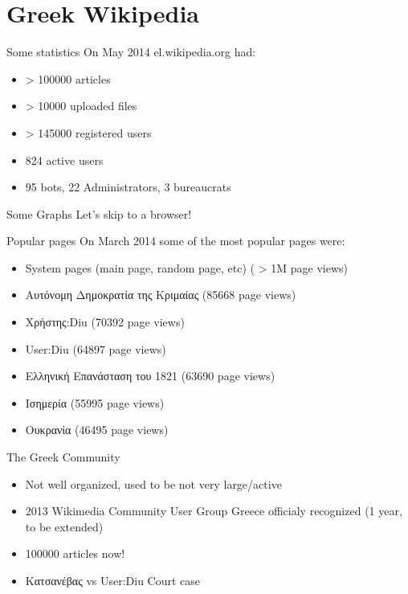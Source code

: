\documentclass{beamer}
\begin{document}
\section{Greek Wikipedia}
\begin{frame} {Some statistics}
	On May 2014 el.wikipedia.org had:
	\begin{itemize}
		\pause \item > 100000 articles
		\pause \item > 10000 uploaded files
		\pause \item > 145000 registered users
		\pause \item 824 active users
		\pause \item 95 bots, 22 Administrators, 3 bureaucrats
	\end{itemize}
\end{frame}
\begin{frame} {Some Graphs}
	Let's skip to a browser!
\end{frame}
\begin{frame} {Popular pages}
	On March 2014 some of the most popular pages were:
	\begin{itemize}
		\pause \item System pages (main page, random page, etc) ( > 1M page views)
		\pause \item Αυτόνομη Δημοκρατία της Κριμαίας (85668 page views)
		\pause \item Χρήστης:Diu (70392 page views)
		\pause \item User:Diu (64897 page views)
		\pause \item Ελληνική Επανάσταση του 1821 (63690 page views)
		\pause \item Ισημερία (55995 page views)
		\pause \item Ουκρανία (46495 page views)
	\end{itemize}
\end{frame}
\begin{frame} {The Greek Community}
	\begin{itemize}
		\pause \item Not well organized, used to be not very large/active
		\pause \item 2013 Wikimedia Community User Group Greece officialy recognized (1 year, to be extended)
		\pause \item 100000 articles now!
		\pause \item Κατσανέβας vs User:Diu Court case
	\end{itemize}
\end{frame}
\end{document}
